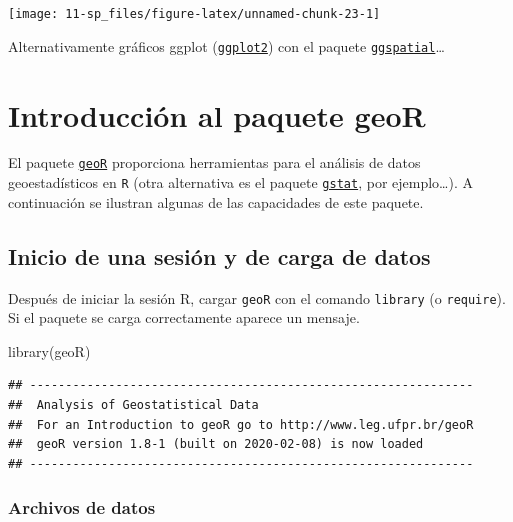 \documentclass[
  spanish,
]{book}
\newenvironment{Shaded}{\begin{snugshade}}{\end{snugshade}}
\newcommand{\FunctionTok}[1]{\textcolor[rgb]{0.00,0.00,0.00}{#1}}
\newcommand{\NormalTok}[1]{#1}
\theoremstyle{break}
\begin{document}
\begin{center}\texttt{[image: 11-sp\_files/figure-latex/unnamed-chunk-23-1]} \end{center}

Alternativamente gráficos ggplot (\href{https://ggplot2.tidyverse.org}{\texttt{ggplot2}}) con el paquete \href{https://paleolimbot.github.io/ggspatial}{\texttt{ggspatial}}\ldots{}

\hypertarget{intro-geoR}{%
\chapter{\texorpdfstring{Introducción al paquete \textbf{geoR}}{Introducción al paquete geoR}}\label{intro-geoR}}

El paquete \href{http://www.leg.ufpr.br/geoR}{\texttt{geoR}} proporciona herramientas para el análisis de datos
geoestadísticos en \texttt{R}
(otra alternativa es el paquete \href{http://r-spatial.github.io/gstat}{\texttt{gstat}}, por ejemplo\ldots).
A continuación se ilustran algunas de las capacidades de este paquete.

\hypertarget{inicio-de-una-sesiuxf3n-y-de-carga-de-datos}{%
\section{Inicio de una sesión y de carga de datos}\label{inicio-de-una-sesiuxf3n-y-de-carga-de-datos}}

Después de iniciar la sesión R, cargar \texttt{geoR} con el comando \texttt{library} (o
\texttt{require}). Si el paquete se carga correctamente aparece un mensaje.

\begin{Shaded}
\begin{Highlighting}[]
\FunctionTok{library}\NormalTok{(geoR)}
\end{Highlighting}
\end{Shaded}

\begin{verbatim}
## --------------------------------------------------------------
##  Analysis of Geostatistical Data
##  For an Introduction to geoR go to http://www.leg.ufpr.br/geoR
##  geoR version 1.8-1 (built on 2020-02-08) is now loaded
## --------------------------------------------------------------
\end{verbatim}

\hypertarget{archivos-de-datos}{%
\subsection{Archivos de datos}\label{archivos-de-datos}}
\end{document}
